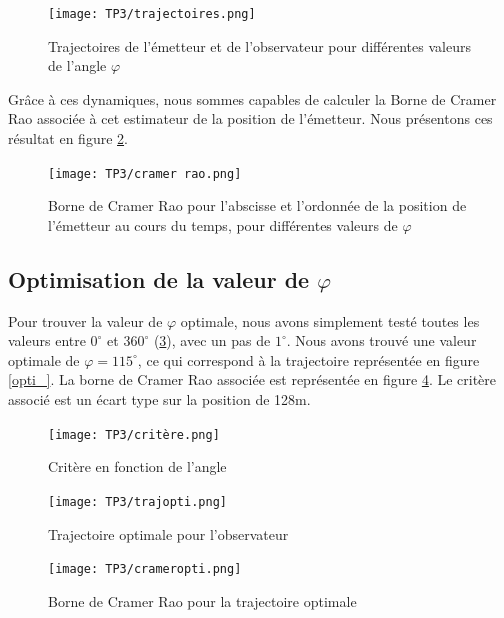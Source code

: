 \documentclass{article}
\begin{document}
 \begin{figure}[h!]
  \centering
  \texttt{[image: TP3/trajectoires.png]}
  \caption{Trajectoires de l'émetteur et de l'observateur pour différentes valeurs de l'angle $\varphi$}
  \label{trajec}
\end{figure}

Grâce à ces dynamiques, nous sommes capables de calculer la Borne de Cramer Rao associée à cet estimateur de la position de l'émetteur. 
Nous présentons ces résultat en figure \ref{cramerrao}. 

\begin{figure}[h!]
  \centering
  \texttt{[image: TP3/cramer rao.png]}
  \caption{Borne de Cramer Rao pour l'abscisse et l'ordonnée de la position de l'émetteur au cours du temps, pour différentes valeurs de $\varphi$}
  \label{cramerrao}
\end{figure}

\subsection{Optimisation de la valeur de $\varphi$}
Pour trouver la valeur de $\varphi$ optimale, nous avons simplement testé toutes les valeurs entre $0^{\circ}$ et $360^{\circ}$ (\ref{crit}), avec un pas de 
$1^{\circ}$. Nous avons trouvé une valeur optimale de $\varphi = 115^{\circ}$, ce qui correspond à la trajectoire représentée en figure
\ref{opti_}. La borne de Cramer Rao associée est représentée en figure \ref{crameropti}. Le critère associé est un écart type sur la position de 128m.

\begin{figure}
   \centering
   \texttt{[image: TP3/critère.png]}
   \caption{Critère en fonction de l'angle}
   \label{crit}
\end{figure}


\begin{figure}[h!]
   \centering
   \begin{minipage}[t]{8cm}
       \centering
       \texttt{[image: TP3/trajopti.png]}
       \caption{Trajectoire optimale pour l'observateur}
       \label{opti_}
   \end{minipage}
   \begin{minipage}[t]{8cm}
       \centering
       \texttt{[image: TP3/crameropti.png]}
       \caption{Borne de Cramer Rao pour la trajectoire optimale}
       \label{crameropti}
   \end{minipage}
\end{figure}
\end{document}
